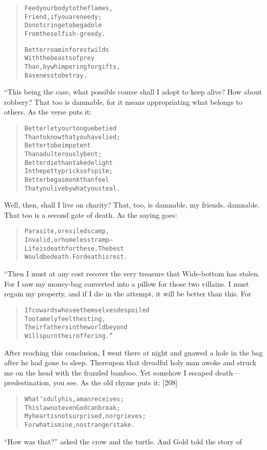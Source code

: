 \documentclass[article, twoside, 14pt]{memoir}
\renewenvironment{verbatim}{%
\begin{quote}%
\vskip -10pt%
\begin{alltt}\normalfont\large}{\end{alltt}%
\end{quote}%
\vskip -10pt
} %
\begin{document}
\begin{verbatim}
Feed your body to the flames,
    Friend, if you are needy;
Do not cringe to beg a dole
    From the selfish-greedy.

Better roam in forest wilds
With the beasts of prey
Than, by whimpering for gifts,
Baseness to betray.
\end{verbatim}
“This being the case, what possible course shall I adopt to keep
alive? How about robbery? That too is damnable, for it means
appropriating what belongs to others. As the verse puts it:

\begin{verbatim}
Better let your tongue be tied
Than to know that you have lied;
Better to be impotent
Than adulterously bent;
Better die than take delight
In the petty pricks of spite;
Better beg as monk than feel
That you live by what you steal.
\end{verbatim}
Well, then, shall I live on charity? That, too, is damnable, my
friends, damnable. That too is a second gate of death. As the
saying goes:

\begin{verbatim}
Parasite, or exiled scamp,
Invalid, or homeless tramp--
Life is death for these. The best
Would be death. For death is rest.
\end{verbatim}
“Then I must at any cost recover the very treasure that Wide-bottom
has stolen. For I saw my money-bag converted into a pillow for
those two villains. I must regain my property, and if I die in the
attempt, it will be better than this. For

\begin{verbatim}
If cowards who see themselves despoiled
    Too tamely feel the sting,
Their fathers in the world beyond
    Will spurn their offering.”
\end{verbatim}
After reaching this conclusion, I went there at night and gnawed a
hole in the bag after he had gone to sleep. Thereupon that dreadful
holy man awoke and struck me on the head with the frazzled bamboo.
Yet somehow I escaped death---predestination, you see. As the old
rhyme puts it: [208]

\begin{verbatim}
What's duly his, a man receives;
    This law not even God can break;
My heart is not surprised, nor grieves;
    For what is mine, no strangers take.
\end{verbatim}
``How was that?'' asked the crow and the turtle. And Gold told the
story of
\end{document}
